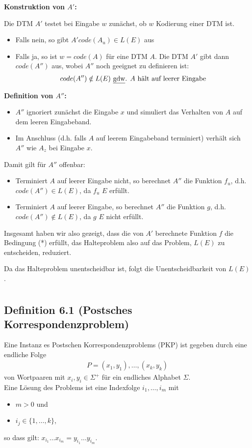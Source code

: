 \textbf{Konstruktion von $A'$:}\par Die DTM $A'$ testet bei Eingabe $w$ zunächst, ob $w$ Kodierung einer DTM ist.
\begin{itemize}
	\item Falls nein, so gibt $A' code(A_u) \in L(E)$ aus
	\item Falls ja, so ist $w = code(A) $ für eine DTM $A$. Die DTM $A'$ gibt dann $code(A'')$ aus, wobei $A''$ noch geeignet zu definieren ist:
	\begin{align*}
		code(A'') \notin L(E) \text{  \underline{gdw}. } A \text{ hält auf leerer Eingabe}
	\end{align*}
\end{itemize}
\textbf{Definition von $A''$:}\par 
\begin{itemize}
	\item $A''$ ignoriert zunächst die Eingabe $x$ und simuliert das Verhalten von $A$ auf dem leeren Eingabeband.
	\item Im Anschluss (d.h. falls $A$ auf leerem Eingabeband terminiert) verhält sich $A''$ wie $A_z$ bei Eingabe $x$.
\end{itemize}
Damit gilt für $A''$ offenbar:
\begin{itemize}
	\item Terminiert $A$ auf leerer Eingabe nicht, so berechnet $A''$ die Funktion $f_u$, d.h. $code(A'') \in L(E)$, da $f_u$ $E$ erfüllt.
	\item Terminiert $A$ auf leerer Eingabe, so berechnet $A''$ die Funktion $g$, d.h. $code(A'')\notin L(E)$, da $g$ $E$ nicht erfüllt.
\end{itemize}
Insgesamt haben wir also gezeigt, dass die von $A'$ berechnete Funktion $f$ die Bedingung (*) erfüllt, das Halteproblem also auf das Problem, $L(E)$ zu entscheiden, reduziert. \par 
Da das Halteproblem unentscheidbar ist, folgt die Unentscheidbarkeit von $L(E)$.
\section{}
\subsection{Definition 6.1 (Postsches Korrespondenzproblem)}
Eine Instanz es Postschen Korrespondenzproblems (PKP) ist gegeben durch eine endliche Folge
\begin{align*}
	P = (x_1,y_1),\ldots,(x_k, y_k)
\end{align*}
von Wortpaaren mit $x_i, y_i \in \Sigma^+$ für ein endliches Alphabet $\Sigma$.\\
Eine Lösung des Problems ist eine Indexfolge $i_1, \ldots, i_m$ mit \begin{itemize}
	\item $m>0$ und
	\item $i_j \in \{1, \ldots, k\}$,
\end{itemize}
so dass gilt: $x_{i_1} \ldots x_{i_m} = y_{i_1} \ldots y_{i_m}$.\par
